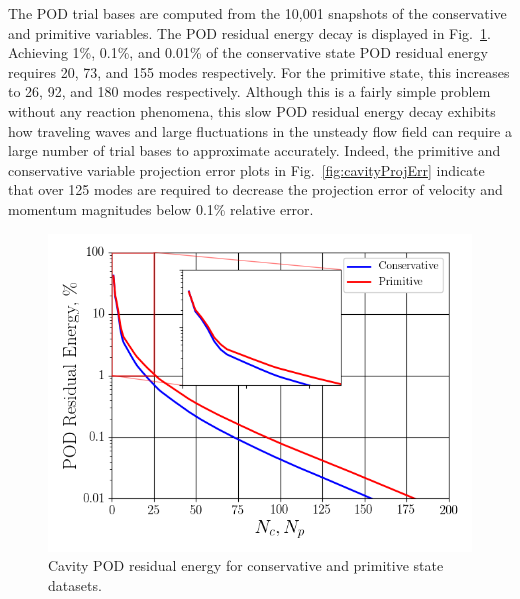 The POD trial bases are computed from the 10,001 snapshots of the conservative and primitive variables. The POD residual energy decay is displayed in Fig.~\ref{fig:cavityPODEnergy}. Achieving 1\%, 0.1\%, and 0.01\% of the conservative state POD residual energy requires 20, 73, and 155 modes respectively. For the primitive state, this increases to 26, 92, and 180 modes respectively. Although this is a fairly simple problem without any reaction phenomena, this slow POD residual energy decay exhibits how traveling waves and large fluctuations in the unsteady flow field can require a large number of trial bases to approximate accurately. Indeed, the primitive and conservative variable projection error plots in Fig.~\ref{fig:cavityProjErr} indicate that over 125 modes are required to decrease the projection error of velocity and momentum magnitudes below 0.1\% relative error.

\begin{figure}
	\centering
	\includegraphics[width=0.75\linewidth]{Chapters/HPROMResults/Images/cavity/cavity_pod_energy_10ms.png}
	\caption{\label{fig:cavityPODEnergy}Cavity POD residual energy for conservative and primitive state datasets.}
\end{figure}

